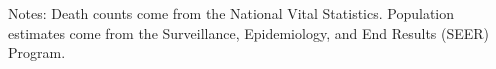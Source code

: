 \documentclass{article}
\begin{document}
\begin{table}[tbp]
{\begin{tabularx}{\linewidth}{lCCCC}
\end{tabularx}
\begin{flushleft}
\footnotesize Notes: Death counts come from the National Vital Statistics. Population estimates come from the Surveillance, Epidemiology, and End Results (SEER) Program.
\end{flushleft}
}
\end{table}
\end{document}
